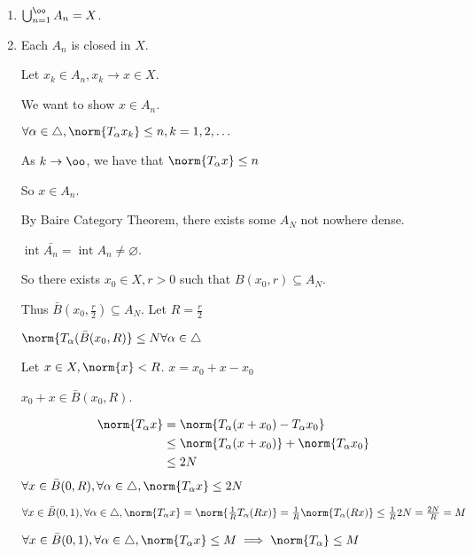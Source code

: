 \documentclass[x11names,reqno,14pt]{extarticle}
\newcommand{\seq}[2][\oo]{_{#2 = 1}^#1}
\newcommand{\bigcupn}[1][\oo]{\bigcup\seq[#1]{n}}
\DeclareMathOperator{\Int}{int}
\begin{document}
\begin{enumerate}

\item $\bigcupn A_n = X$. 

\item Each $A_n$ is closed in $X$. 

Let $x_k \in A_n, x_k \to x \in X$. 

We want to show $x \in A_n$. 

$\forall\alpha\in\bigtriangleup, \norm{T_\alpha x_k}\leq n, k = 1, 2, \dots$

As $k\to\oo$, we have that $\norm{T_\alpha x}\leq n$

So $x \in A_n$. 

By Baire Category Theorem, there exists some $A_N$ not nowhere dense. 

$\Int \bar{A_n} = \Int A_n \neq \varnothing$.

So there exists $x_0 \in X, r > 0$  such that $B(x_0, r) \subseteq A_N$. 

Thus $\bar{B}(x_0, \frac{r}{2}) \subseteq A_N$. Let $R = \frac{r}{2}$

$\norm{T_\alpha(\bar{B}(x_0, R)}\leq N\forall\alpha\in\bigtriangleup$

Let $x \in X, \norm{x}<R$. $x = x_0 + x - x_0$

$x_0 + x \in\bar{B}(x_0, R)$. 

\begin{align*}
\norm{T_\alpha x} & = \norm{T_\alpha(x + x_0) - T_\alpha x_0} \\
& \leq \norm{T_\alpha(x + x_0)} + \norm{T_\alpha x_0} \\
& \leq 2N
\end{align*}
$\forall x \in\bar{B}(0,R), \forall\alpha\in\bigtriangleup,\norm{T_\alpha x}\leq 2N$

$\forall x\in\bar{B}(0,1),\forall\alpha\in\bigtriangleup,\norm{T_\alpha x}= \norm{\frac{1}{R}T_\alpha (Rx)} = \frac{1}{R}\norm{T_\alpha(Rx)}\leq\frac{1}{R}2N = \frac{2N}{R} = M$

$\forall x\in\bar{B}(0,1),\forall\alpha\in\bigtriangleup,\norm{T_\alpha x}\leq M \implies \norm{T_\alpha}\leq M$






\end{enumerate}
\end{document}
